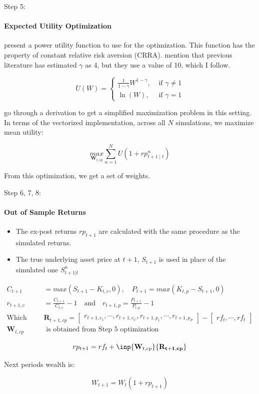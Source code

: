 \documentclass[9pt]{beamer}
\begin{document}
\begin{frame}{Step 5: \citeauthor{faias2017optimal}}
\framesubtitle{Expected Utility Optimization}
\citeauthor{faias2017optimal} present a power utility function to use for the optimization. This function has the property of constant relative risk aversion (CRRA). \citeauthor{faias2017optimal} mention that previous literature has estimated $\gamma$ as 4, but they use a value of 10, which I follow.

\[U(W)=\left\{\begin{array}{ll}\frac{1}{1-\gamma} W^{1-\gamma}, & \text { if } \gamma \neq 1 \\ \ln (W), & \text { if } \gamma=1\end{array}\right.\]


\citeauthor{faias2017optimal} go through a derivation to get a simplified maximization problem in this setting. In terms of the vectorized implementation, across all $N$ simulations, we maximize mean utility:

\[\underset{\mathbf{W}_{t, cp}}{max} \sum_{n = 1}^{N} U(1 + rp_{t+1 \mid t}^{n})\]

From this optimization, we get a set of weights.
\end{frame}

\begin{frame}{Step 6, 7, 8: \citeauthor{faias2017optimal}}
\framesubtitle{Out of Sample Returns}
\begin{itemize}
    \item The ex-post returns $rp_{t+1}$ are calculated with the same procedure as the simulated returns.
    \item The true underlying asset price at $t+1$, $S_{t+1}$ is used in place of the simulated one $S_{t+1|t}^{n}$
\end{itemize}

\begin{align}
\nonumber C_{t+1} &= max(S_{t+1} - K_{t, c}, 0), \quad P_{t+1} = max(K_{t, p} - S_{t+1}, 0)
\\ \nonumber r_{t+1, c} &= \frac{C_{t+1}}{C_{t, c}} - 1 \quad \text{and} \quad r_{t+1, p} = \frac{P_{t+1}}{P_{t, p}} - 1
\\ \nonumber \text{Which gives } & \mathbf{R}_{t+1, cp} = \begin{bmatrix} r_{t + 1, c_{1}}, \dotsb, r_{t + 1, c_{C}}, r_{t + 1, p_{1}}, \dotsb, r_{t + 1, p_{P}} \end{bmatrix} - \begin{bmatrix} rf_{t}, \dotsb, rf_{t} \end{bmatrix}
\\ \nonumber \mathbf{W}_{t, cp} & \text{ is obtained from Step 5 optimization}
\end{align}

\[rp_{t+1} = rf_{t} + \inp{\mathbf{W}_{t, cp}}{\mathbf{R_{t+1, cp}}}\]

Next periods wealth is:

\[W_{t+1} = W_{t} (1 + rp_{t+1})\]
\end{frame}
\end{document}
